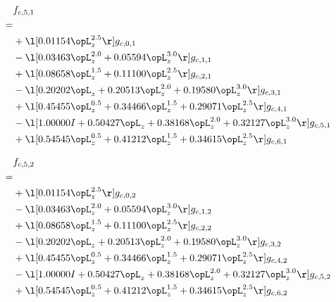 \begin{alignat}{2} 
\label{eq:f_51_0} 
& f_{c,5,1} \nonumber \\ 
 = \\ 
& + \l[  0.01154 \opL_z^{2.5}  \r] g_{c,0,1} \nonumber \\ 
& - \l[  0.03463 \opL_z^{2.0} +  0.05594 \opL_z^{3.0}  \r] g_{c,1,1} \nonumber \\ 
& + \l[  0.08658 \opL_z^{1.5} +  0.11100 \opL_z^{2.5}  \r] g_{c,2,1} \nonumber \\ 
& - \l[  0.20202 \opL_z +  0.20513 \opL_z^{2.0} +  0.19580 \opL_z^{3.0}  \r] g_{c,3,1} \nonumber \\ 
& + \l[  0.45455 \opL_z^{0.5} +  0.34466 \opL_z^{1.5} +  0.29071 \opL_z^{2.5}  \r] g_{c,4,1} \nonumber \\ 
& - \l[  1.00000 I +  0.50427 \opL_z +  0.38168 \opL_z^{2.0} +  0.32127 \opL_z^{3.0}  \r] g_{c,5,1} \nonumber \\ 
& + \l[  0.54545 \opL_z^{0.5} +  0.41212 \opL_z^{1.5} +  0.34615 \opL_z^{2.5}  \r] g_{c,6,1} \nonumber \\ 
\end{alignat} 


\begin{alignat}{2} 
\label{eq:f_52_0} 
& f_{c,5,2} \nonumber \\ 
 = \\ 
& + \l[  0.01154 \opL_z^{2.5}  \r] g_{c,0,2} \nonumber \\ 
& - \l[  0.03463 \opL_z^{2.0} +  0.05594 \opL_z^{3.0}  \r] g_{c,1,2} \nonumber \\ 
& + \l[  0.08658 \opL_z^{1.5} +  0.11100 \opL_z^{2.5}  \r] g_{c,2,2} \nonumber \\ 
& - \l[  0.20202 \opL_z +  0.20513 \opL_z^{2.0} +  0.19580 \opL_z^{3.0}  \r] g_{c,3,2} \nonumber \\ 
& + \l[  0.45455 \opL_z^{0.5} +  0.34466 \opL_z^{1.5} +  0.29071 \opL_z^{2.5}  \r] g_{c,4,2} \nonumber \\ 
& - \l[  1.00000 I +  0.50427 \opL_z +  0.38168 \opL_z^{2.0} +  0.32127 \opL_z^{3.0}  \r] g_{c,5,2} \nonumber \\ 
& + \l[  0.54545 \opL_z^{0.5} +  0.41212 \opL_z^{1.5} +  0.34615 \opL_z^{2.5}  \r] g_{c,6,2} \nonumber \\ 
\end{alignat} 


